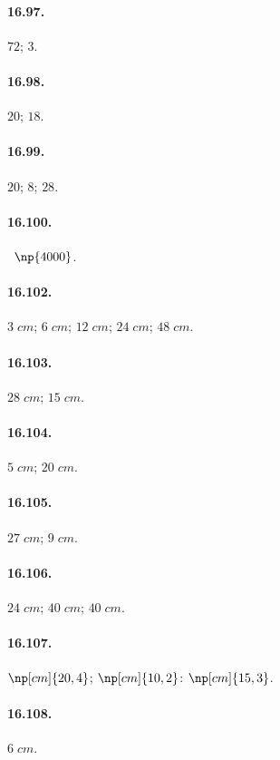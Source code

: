 \begin{multicols}{2}
\paragraph{16.97.}
$72$; $3$.

\paragraph{16.98.}
$20$; $18$.

\paragraph{16.99.}
$20$; $8$; $28$.

\paragraph{16.100.}
\officialeuro~$\np{4000}$.

\paragraph{16.102.}
$3\;\unit{cm}$; $6\;\unit{cm}$; $12\;\unit{cm}$; $24\;\unit{cm}$; $48\;\unit{cm}$.

\paragraph{16.103.}
$28\;\unit{cm}$; $15\;\unit{cm}$.

\paragraph{16.104.}
$5\;\unit{cm}$; $20\;\unit{cm}$.

\paragraph{16.105.}
$27\;\unit{cm}$; $9\;\unit{cm}$.

\paragraph{16.106.}
$24\;\unit{cm}$; $40\;\unit{cm}$; $40\;\unit{cm}$.

\paragraph{16.107.}
$\np[cm]{20,4}$; $\np[cm]{10,2}$: $\np[cm]{15,3}$.

\paragraph{16.108.}
$6\;\unit{cm}$.


\end{multicols}
